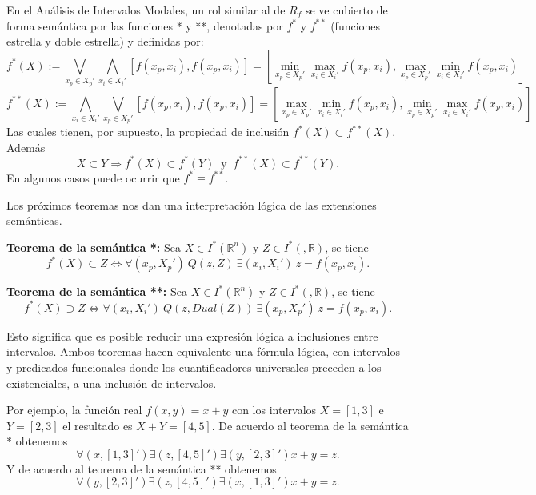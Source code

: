 En el Análisis de Intervalos Modales, un rol similar al de $R_f$ se ve cubierto de forma semántica por las funciones * y **, denotadas por $f^*$ y $f^{**}$ (funciones estrella y doble estrella) y definidas por:
\begin{equation}
f^*(X) := \bigvee_{x_p \in X_p'} \bigwedge_{x_i \in X_i'} [f(x_p,x_i),f(x_p,x_i)] = \left[ \min_{x_p \in X_p'} \max_{x_i \in X_i'} f(x_p,x_i), \max_{x_p \in X_p'} \min_{x_i \in X_i'} f(x_p,x_i) \right]
\nonumber
\end{equation}
\begin{equation}
f^{**}(X) := \bigwedge_{x_i \in X_i'} \bigvee_{x_p \in X_p'} [f(x_p,x_i),f(x_p,x_i)] = \left[ \max_{x_p \in X_p'} \min_{x_i \in X_i'} f(x_p,x_i), \min_{x_p \in X_p'} \max_{x_i \in X_i'} f(x_p,x_i) \right]
\nonumber
\end{equation}
Las cuales tienen, por supuesto, la propiedad de inclusión $f^*(X) \subset f^{**}(X)$. Además
\begin{equation}
X \subset Y \Rightarrow f^*(X) \subset f^*(Y) \ \text{ y } \ f^{**}(X) \subset f^{**}(Y).
\nonumber
\end{equation}
En algunos casos puede ocurrir que $f^* \equiv f^{**}$.

Los próximos teoremas nos dan una interpretación lógica de las extensiones semánticas.

\begin{theorem}{\textbf{Teorema de la semántica *:}}\label{theorem1}
Sea $X \in I^*(\mathbb{R}^n)$ y $Z \in I^*(,\mathbb{R})$, se tiene
$$f^*(X) \subset Z \iff \forall(x_p, X_p') \ Q(z,Z) \ \exists (x_i,X_i') \ z = f(x_p,x_i).$$
\end{theorem}

\begin{theorem}{\textbf{Teorema de la semántica **:}}\label{theorem2}
Sea $X \in I^*(\mathbb{R}^n)$ y $Z \in I^*(,\mathbb{R})$, se tiene
$$f^*(X) \supset Z \iff \forall(x_i, X_i') \ Q(z,Dual(Z)) \ \exists (x_p,X_p') \ z = f(x_p,x_i).$$
\end{theorem}

Esto significa que es posible reducir una expresión lógica a inclusiones entre intervalos. Ambos teoremas hacen equivalente una fórmula lógica, con intervalos y predicados funcionales donde los cuantificadores universales preceden a los existenciales, a una inclusión de intervalos.

Por ejemplo, la función real $f(x,y) = x+y$ con los intervalos $X = [1,3]$ e $Y = [2,3]$ el resultado es $X + Y = [4,5]$. De acuerdo al teorema de la semántica * obtenemos
$$\forall(x,[1,3]')\exists(z,[4,5]')\exists(y,[2,3]')x+y=z.$$
Y de acuerdo al teorema de la semántica ** obtenemos
$$\forall(y,[2,3]')\exists(z,[4,5]')\exists(x,[1,3]')x+y=z.$$

